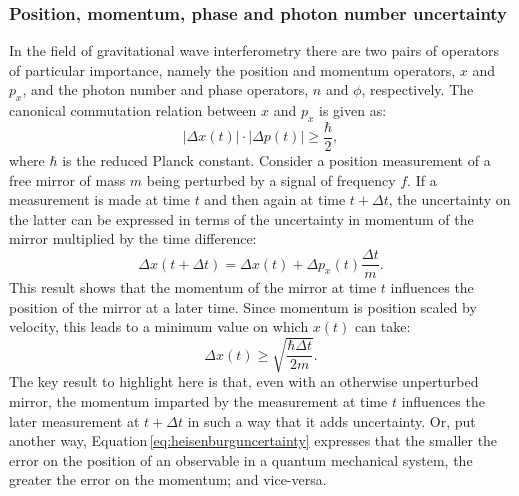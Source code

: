 \subsubsection{\label{sec:operator-uncertainty}Position, momentum, phase and photon number uncertainty}

In the field of gravitational wave interferometry there are two pairs of operators of particular importance, namely the position and momentum operators, $x$ and $p_x$, and the photon number and phase operators, $n$ and $\phi$, respectively. The canonical commutation relation between $x$ and $p_x$ is given as:
\begin{equation}
 | \Delta x\left( t \right) | \cdot |\Delta p\left( t \right) | \geq
\frac{\hbar}{2},
 \label{eq:heisenburguncertainty}
\end{equation}
where $\hbar$ is the reduced Planck constant. Consider a position measurement of a free mirror of mass $m$ being perturbed by a signal of frequency $f$. If a measurement is made at time $t$ and then again at time $t + \Delta t$, the uncertainty on the latter can be expressed in terms of the uncertainty in momentum of the mirror multiplied by the time difference:
\begin{equation}
 \Delta x \left( t + \Delta t \right) = \Delta x \left( t \right) + \Delta p_x
\left( t \right) \frac{\Delta t}{m}.
 \label{eq:heisenburgtime}
\end{equation}
This result shows that the momentum of the mirror at time $t$ influences the position of the mirror at a later time. Since momentum is position scaled by velocity, this leads to a minimum value on which $x \left( t \right)$ can take:
\begin{equation}
 \Delta x \left( t \right) \geq \sqrt{\frac{\hbar \Delta t}{2m}}.
\end{equation}
The key result to highlight here is that, even with an otherwise unperturbed mirror, the momentum imparted by the measurement at time $t$ influences the later measurement at $t + \Delta t$ in such a way that it adds uncertainty. Or, put another way, Equation\,\ref{eq:heisenburguncertainty} expresses that the smaller the error on the position of an observable in a quantum mechanical system, the greater the error on the momentum; and vice-versa.

